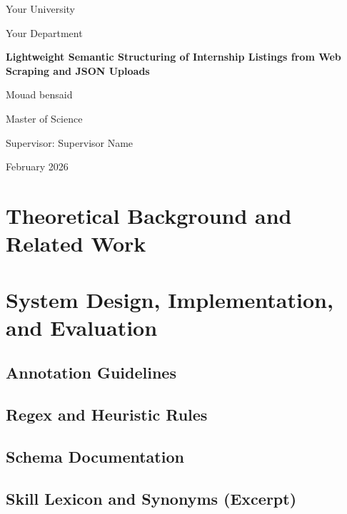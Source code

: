 \documentclass[11pt,a4paper,oneside]{report}
\newcommand{\ThesisTitle}{Lightweight Semantic Structuring of Internship Listings from Web Scraping and JSON Uploads}
\newcommand{\AuthorName}{Mouad bensaid}
\newcommand{\DegreeName}{Master of Science}
\newcommand{\UniversityName}{Your University}
\newcommand{\DepartmentName}{Your Department}
\newcommand{\SupervisorName}{Supervisor Name}
\newcommand{\SubmissionDate}{February 2026}
\begin{document}
\begin{titlepage}
  \centering
  {\large \UniversityName \par}
  \vspace{0.5cm}
  {\normalsize \DepartmentName \par}
  \vspace{2.0cm}
  {\LARGE \bfseries \ThesisTitle \par}
  \vspace{2.0cm}
  {\large \AuthorName \par}
  \vspace{0.5cm}
  {\normalsize \DegreeName \par}
  \vspace{1.5cm}
  {\normalsize Supervisor: \SupervisorName \par}
  \vfill
  {\normalsize \SubmissionDate \par}
\end{titlepage}





\tableofcontents
\listoffigures

\printglossaries

\clearpage
{}

\part{Theoretical Background and Related Work}






\part{System Design, Implementation, and Evaluation}











\appendix
\chapter{Annotation Guidelines}
\chapter{Regex and Heuristic Rules}
\chapter{Schema Documentation}
\chapter{Skill Lexicon and Synonyms (Excerpt)}



\end{document}
